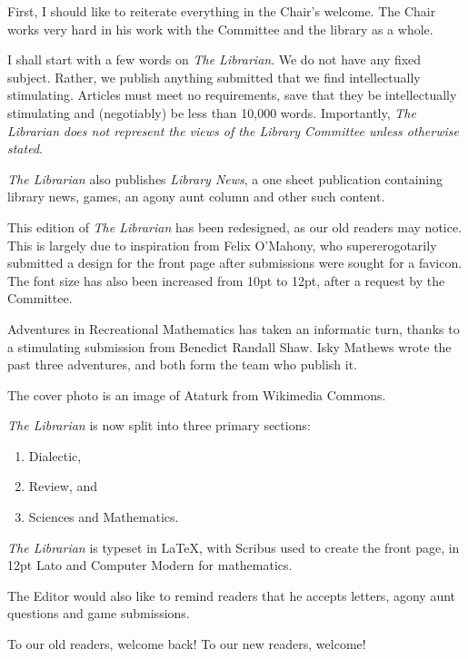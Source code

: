 \documentclass[12pt,a4paper]{report}
\begin{document}
\begin{multicols}{2}

First, I should like to reiterate everything in the Chair's welcome. The Chair works very hard in his work with the Committee and the library as a whole.

I shall start with a few words on \textit{The Librarian}. We do not have any fixed subject. Rather, we publish anything submitted that we find intellectually stimulating. Articles must meet no requirements, save that they be intellectually stimulating and (negotiably) be less than 10,000 words. Importantly, \textit{The Librarian} \textit{does not represent the views of the Library Committee unless otherwise stated}.

\textit{The Librarian} also publishes \textit{Library News}, a one sheet publication containing library news, games, an agony aunt column and other such content.

This edition of \textit{The Librarian} has been redesigned, as our old readers may notice. This is largely due to inspiration from Felix O'Mahony, who supererogotarily submitted a design for the front page after submissions were sought for a favicon. The font size has also been increased from 10pt to 12pt, after a request by the Committee.

Adventures in Recreational Mathematics has taken an informatic turn, thanks to a stimulating submission from Benedict Randall Shaw. Isky Mathews wrote the past three adventures, and both form the team who publish it.

The cover photo is an image of Ataturk from Wikimedia Commons.

\textit{The Librarian} is now split into three primary sections:
\begin{enumerate}
	\item Dialectic,
	\item Review, and
	\item Sciences and Mathematics.
\end{enumerate}

\textit{The Librarian} is typeset in \LaTeX, with Scribus used to create the front page, in 12pt Lato and Computer Modern for mathematics.

The Editor would also like to remind readers that he accepts letters, agony aunt questions and game submissions.

To our old readers, welcome back! To our new readers, welcome!

\end{multicols}
\end{document}
